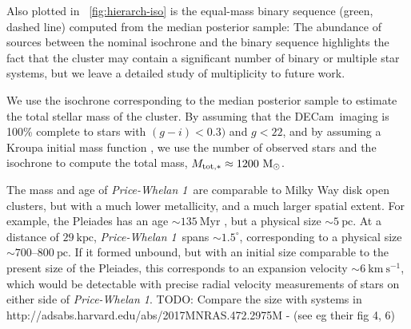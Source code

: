 \documentclass[twocolumn]{aastex62}
\newcommand{\decam}{DECam}
\newcommand{\todo}[1]{{\color{red} TODO: #1}}
\newcommand{\msun}{\textrm{M}_\odot}
\newcommand{\kms}{\ensuremath{\textrm{km}~\textrm{s}^{-1}}}
\newcommand{\clustername}{\textsl{Price-Whelan 1}}
\newcommand{\cldist}{\ensuremath{29~\textrm{kpc}}}
\begin{document}
Also plotted in \figurename~\ref{fig:hierarch-iso} is the equal-mass binary sequence (green, dashed line) computed from the median posterior sample: The abundance of sources between the nominal isochrone and the binary sequence highlights the fact that the cluster may contain a significant number of binary or multiple star systems, but we leave a detailed study of multiplicity to future work.

We use the isochrone corresponding to the median posterior sample to estimate the total stellar mass of the cluster.
By assuming that the \decam\ imaging is 100\% complete to stars with $(g-i) < 0.3)$ and $g < 22$, and by assuming a Kroupa initial mass function \citep{Kroupa:2001}, we use the number of observed stars and the isochrone to compute the total mass, $M_{\rm tot, *} \approx 1200~\msun$.

The mass and age of \clustername\ are comparable to Milky Way disk open clusters, but with a much lower metallicity, and a much larger spatial extent.
For example, the Pleiades has an age $\sim 135~\textrm{Myr}$ \citep{Gossage:2018}, but a physical size $\sim 5~\textrm{pc}$.
At a distance of $\cldist$, \clustername\ spans $\sim 1.5^\circ$, corresponding to a physical size $\sim 700$--$800~\textrm{pc}$.
If it formed unbound, but with an initial size comparable to the present size of the Pleiades, this corresponds to an expansion velocity $\sim 6~\kms$, which would be detectable with precise radial velocity measurements of stars on either side of \clustername.
\todo{Compare the size with systems in http://adsabs.harvard.edu/abs/2017MNRAS.472.2975M - (see eg their fig 4, 6)}
\end{document}
